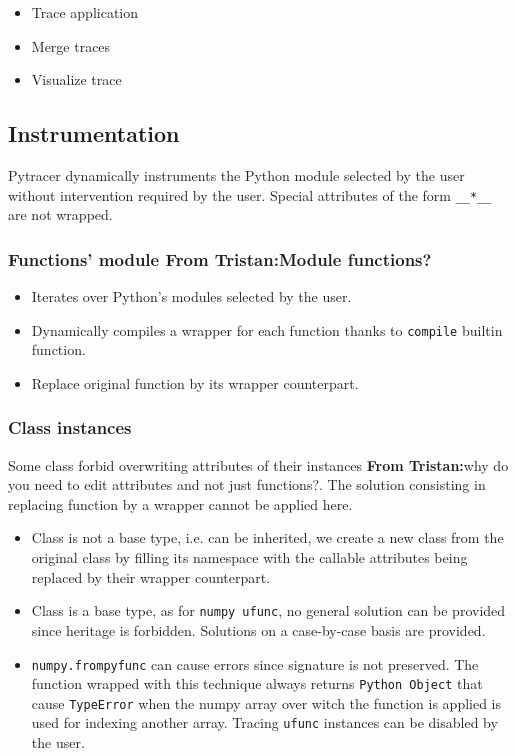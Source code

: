 \documentclass{article}
\newcommand{\tristan}[1]{\color{orange}\textbf{From Tristan:}#1\color{black}}
\newcommand{\Yohan}[1]{
\todo[inline,backgroundcolor=green]{YC: #1}
}
\begin{document}
\Yohan{Add figure for the workflow}

\begin{itemize}
    \item Trace application
    \item Merge traces
    \item Visualize trace
\end{itemize}

\subsection{Instrumentation}
Pytracer dynamically instruments the Python module selected by the user 
without intervention required by the user.
Special attributes of the form \texttt{\_\_*\_\_} are not wrapped.

\subsubsection{Functions' module \tristan{Module functions?}}
\begin{itemize}
    \item Iterates over Python's modules selected by the user.
    \item Dynamically compiles a wrapper for each function thanks to \texttt{compile} builtin function.
    \item Replace original function by its wrapper counterpart.
\end{itemize}
\subsubsection{Class instances}
    Some class forbid overwriting attributes of their instances \tristan{why do you need to edit attributes and not just functions?}.
The solution consisting in replacing function by a wrapper cannot be applied here.
\begin{itemize}
    \item Class is not a base type, i.e. can be inherited, we create a new class from the original class by filling its namespace with the callable attributes being replaced by their wrapper counterpart.
    \item Class is a base type, as for \texttt{numpy ufunc}, no 
    general solution can be provided since heritage is forbidden.
    Solutions on a case-by-case basis are provided. 
    \item \texttt{numpy.frompyfunc} can cause errors since signature is not preserved. The function wrapped with this technique always returns \texttt{Python Object} that cause \texttt{TypeError} when the numpy array
    over witch the function is applied is used for indexing another array.
    Tracing \texttt{ufunc} instances can be disabled by the user.
\end{itemize}
\end{document}
